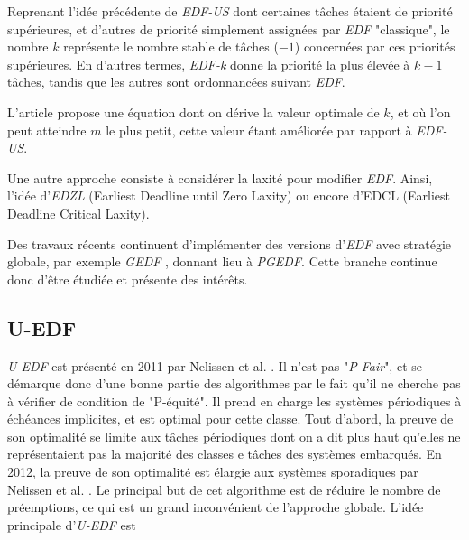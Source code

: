 \documentclass[11pt,a4paper,oneside]{report}
\begin{document}
	Reprenant l'idée précédente de \textit{EDF-US} dont certaines tâches étaient de priorité 
	supérieures, et d'autres de priorité simplement assignées par \textit{EDF} "classique", 
	le nombre $k$ représente le nombre stable de tâches ($-1$) concernées par ces priorités 
	supérieures. En d'autres termes, \textit{EDF-k} donne la priorité la plus élevée à 
	$k - 1$ tâches, tandis que les autres sont ordonnancées suivant \textit{EDF}.\medskip
	
	L'article propose une équation dont on dérive la valeur optimale de $k$, et où l'on peut 
	atteindre $m$ le plus petit, cette valeur étant améliorée par rapport à \textit{EDF-US}.\medskip
	
	Une autre approche consiste à considérer la laxité pour modifier \textit{EDF}. 
	Ainsi, l'idée d'\textit{EDZL} (Earliest Deadline until Zero Laxity) \cite{cirinei_edzl_2007} ou encore d'EDCL \cite{kato_real-time_2007}
	(Earliest Deadline Critical Laxity). \medskip
	
	Des travaux récents continuent d'implémenter des versions d'\textit{EDF} avec stratégie 
	globale, par exemple \textit{GEDF} \cite{li_global_2015}, donnant lieu à \textit{PGEDF}. Cette 
	branche continue donc d'être étudiée et présente des intérêts.
	
	\subsection{U-EDF}
	\textit{U-EDF} est présenté en 2011 par Nelissen et al. \cite{nelissen_reducing_2011}. Il n'est pas "\textit{P-Fair}", et se démarque donc d'une bonne partie des algorithmes 
	par le fait qu'il ne cherche pas à vérifier de condition de "P-équité".
	Il prend en charge les systèmes périodiques à échéances implicites, et est optimal pour cette classe. 
	Tout d'abord, la preuve de son optimalité se limite aux tâches périodiques dont on a dit plus haut qu'elles 
	ne représentaient pas la majorité des classes e tâches des systèmes embarqués. 
	En 2012, la preuve de son optimalité est élargie aux systèmes sporadiques par Nelissen et al. \cite{nelissen_u-edf_2012}. Le principal but de cet algorithme est de réduire le nombre de préemptions, 
	ce qui est un grand inconvénient de l'approche globale. \medskip
	L'idée principale d'\textit{U-EDF} est %
	
\end{document}

